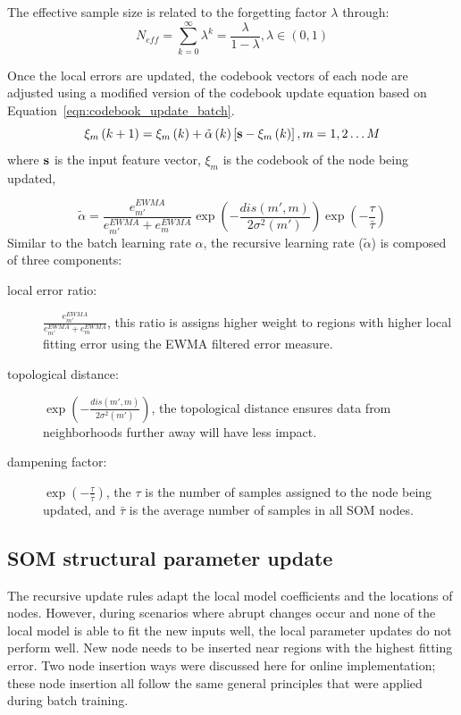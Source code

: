 \documentclass[review,3p]{elsarticle}
\renewcommand\[{\begin{equation}}
\renewcommand\]{\end{equation}}
\begin{document}
The effective sample size is related to the forgetting factor $\lambda$ through:
\[{N_{eff}} = \sum\limits_{k = 0}^\infty  {{\lambda ^k}}  = \frac{\lambda }{{1 - \lambda }},\lambda  \in \left( {0,1} \right)\]

Once the local errors are updated, the codebook vectors of each node are adjusted using a modified version of the codebook update equation based on Equation~\ref{eqn:codebook_update_batch}.
\[{\xi _m}\left( {k + 1} \right) = {\xi _m}\left( k \right) + \tilde \alpha \left( k \right)\left[ {{\bf{s}} - {\xi _m}\left( k \right)} \right], m = 1,2 \ldots M\]
where $\bf s$ is the input feature vector, $\xi_m$ is the codebook of the node being updated, 

\[
{\tilde \alpha} = \frac{e^{EWMA}_{m'}}{e^{EWMA}_{m'} +{e^{EWMA}_m}} \exp \left( { - \frac{{dis\left({m',m} \right)}}{{2{\sigma ^2}\left( {m'} \right)}}}\right) \exp \left( -\frac{\tau}{\bar{\tau}}\right)
\]
Similar to the batch learning rate $\alpha$, the recursive learning rate
($\tilde \alpha$) is composed of three components:
       \begin{description}
            \item[local error ratio:] $\frac{e^{EWMA}_{m'}}{e^{EWMA}_{m'} +
                {e^{EWMA}_m}}$, this ratio is assigns higher weight to
                regions with higher local fitting error using the EWMA
                filtered error measure.
            \item[topological distance:] $\exp \left( { - \frac{{dis\left(
                {m',m} \right)}}{{2{\sigma ^2}\left( {m'} \right)}}}
                \right)$, the topological distance ensures data from
                neighborhoods further away will have less impact.
            \item[dampening factor:] $\exp \left( -\frac{\tau}{\bar{\tau}}\right)$,
                the $\tau$ is the number of samples assigned to the node being updated, and $\bar{\tau}$ is the average number of samples in all SOM nodes.
        \end{description}

\subsection{SOM structural parameter update}
The recursive update rules adapt the local model coefficients and the locations of nodes. 
However, during scenarios where abrupt changes occur and none of the local model is able to fit the new inputs well, the local parameter updates do not perform well. 
New node needs to be inserted near regions with the highest fitting error.
Two node insertion ways were discussed here for online implementation; these node
insertion all follow the same general principles that were applied
during batch training.
\end{document}

